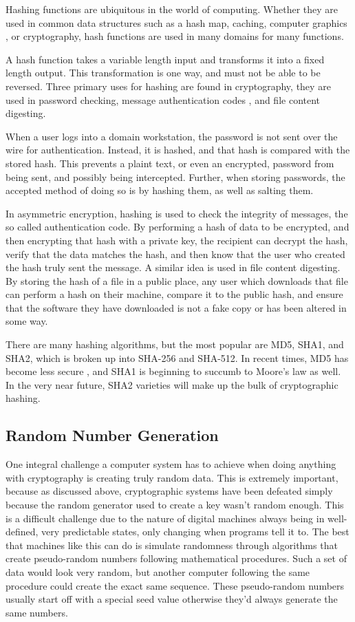 \documentclass[journal]{IEEEtran}
\begin{document}
Hashing functions are ubiquitous in the world of computing.  Whether they are used in common data structures such as a hash map, caching, computer graphics \cite{gpu}, or cryptography, hash functions are used in many domains for many functions.  

A hash function takes a variable length input and transforms it into a fixed length output.  This transformation is one way, and must not be able to be reversed.  Three primary uses for hashing are found in cryptography, they are used in password checking, message authentication codes \cite{hash}, and file content digesting.

When a user logs into a domain workstation, the password is not sent over the wire for authentication.  Instead, it is hashed, and that hash is compared with the stored hash.  This prevents a plaint text, or even an encrypted, password from being sent, and possibly being intercepted.  Further, when storing passwords, the accepted method of doing so is by hashing them, as well as salting them. 

In asymmetric encryption, hashing is used to check the integrity of messages, the so called authentication code.  By performing a hash of data to be encrypted, and then encrypting that hash with a private key, the recipient can decrypt the hash, verify that the data matches the hash, and then know that the user who created the hash truly sent the message.  A similar idea is used in file content digesting.  By storing the hash of a file in a public place, any user which downloads that file can perform a hash on their machine, compare it to the public hash, and ensure that the software they have downloaded is not a fake copy or has been altered in some way.

There are many hashing algorithms, but the most popular are MD5, SHA1, and SHA2, which is broken up into SHA-256 and SHA-512.  In recent times, MD5 has become less secure \cite{hashRainbow} \cite{hashBotnet}, and SHA1 is beginning to succumb to Moore's law as well.  In the very near future, SHA2 varieties will make up the bulk of cryptographic hashing.



\subsection{Random Number Generation}

One integral challenge a computer system has to achieve when doing anything with cryptography is creating truly random data.  This is extremely important, because as discussed above, cryptographic systems have been defeated simply because the random generator used to create a key wasn't random enough.  This is a difficult challenge due to the nature of digital machines always being in well-defined, very predictable states, only changing when programs tell it to.  The best that machines like this can do is simulate randomness through algorithms that create pseudo-random numbers following mathematical procedures.  Such a set of data would look very random, but another computer following the same procedure could create the exact same sequence.  These pseudo-random numbers usually start off with a special seed value otherwise they'd always generate the same numbers.
\end{document}
